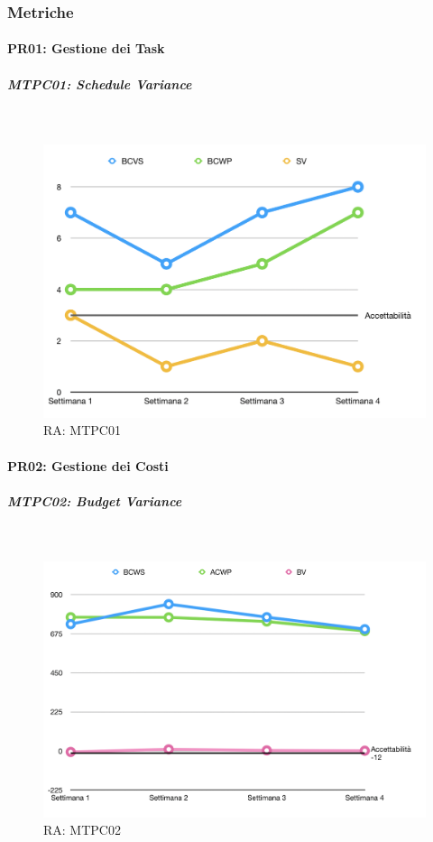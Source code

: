 \subsubsection{Metriche}

\paragraph{PR01: Gestione dei Task}
\subparagraph{MTPC01: Schedule Variance}  \-\\

\begin{figure}[H]
	\begin{center}
		\includegraphics[scale=0.5]{./images/grafici_RA/MTPC01.png} 
		\caption{RA: MTPC01}
	\end{center}
\end{figure}

\paragraph{PR02: Gestione dei Costi}
\subparagraph{MTPC02: Budget Variance}  \-\\

\begin{figure}[H]
	\begin{center}
		\includegraphics[scale=0.5]{./images/grafici_RA/MTPC02.png} 
		\caption{RA: MTPC02}
	\end{center}
\end{figure}

